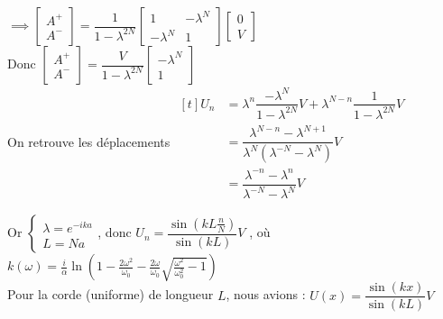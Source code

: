 \documentclass[12pt,a4paper]{article}
\begin{document}
\begin{sol}
		$\implies\begin{bmatrix}
			A^+ \\ A^-
		\end{bmatrix} = \dfrac1{1-\lambda^{2N}}\begin{bmatrix}
			1 & - \lambda^N \\
			-\lambda^N & 1
		\end{bmatrix}\begin{bmatrix}
			0 \\ V
		\end{bmatrix}$\\
		
		Donc $\begin{bmatrix}
			A^+ \\ A^-
		\end{bmatrix} = \dfrac V{1-\lambda^{2N}}\begin{bmatrix}
			-\lambda^N \\ 1
		\end{bmatrix}$\\
		On retrouve les déplacements $\begin{aligned}[t]
			U_n & = \lambda^n \dfrac{-\lambda^N}{1-\lambda^{2N}}V + \lambda^{N-n}\dfrac1{1-\lambda^{2N}}V \\
			& = \dfrac{\lambda^{N-n} - \lambda^{N+1}}{\lambda^N(\lambda^{-N}-\lambda^N)}V \\
			&= \dfrac{\lambda^{-n}-\lambda^n}{\lambda^{-N}-\lambda^N}V
		\end{aligned}$\\
		\begin{minipage}[t]{15cm}
			Or $\begin{cases}
				\lambda = e^{-ika} \\
				L = Na
			\end{cases}$, donc $U_n = \dfrac{\sin(kL\frac nN)}{\sin(kL)}V$ 
			, où $k(\omega)=\frac i\alpha\ln\left(1-\frac{2\omega^2}{\omega_0} - \frac{2\omega}{\omega_0}\sqrt{\frac{\omega^2}{\omega_0^2}-1}\right)$\\
			
			Pour la corde (uniforme) de longueur $L$, nous avions : $U(x) = \dfrac{\sin(kx)}{\sin(kL)} V$
		\end{minipage}	
	\end{sol}
	
\end{document}
